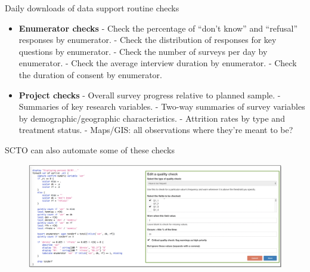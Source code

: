 \documentclass[aspectratio=169]{beamer}
\begin{document}
\begin{frame}[fragile]{Daily downloads of data support routine checks}
\begin{multicols}{2}	
	
	\begin{itemize}[<default overlay specification>]
		\item<1> \textbf{Enumerator checks}
			\newline - Check the percentage of “don’t know” and “refusal” responses by enumerator.
			\newline - Check the distribution of responses for key questions by enumerator.
			\newline - Check the number of surveys per day by enumerator.
			\newline - Check the average interview duration by enumerator.
			\newline - Check the duration of consent by enumerator.
		\item<1> \textbf{ Project checks}
			\newline - Overall survey progress relative to planned sample.
			\newline - Summaries of key research variables.
			\newline - Two-way summaries of survey variables by demographic/geographic characteristics.
			\newline - Attrition rates by type and treatment status.
			\newline - Maps/GIS: all observations where they’re meant to be?
	\end{itemize}
	
\end{multicols}
\end{frame}


\begin{frame}{SCTO can also automate some of these checks}

\begin{figure}
	\centering
	\includegraphics[width=\linewidth]{img/HFCs2}
\end{figure}

\end{frame}
\end{document}

